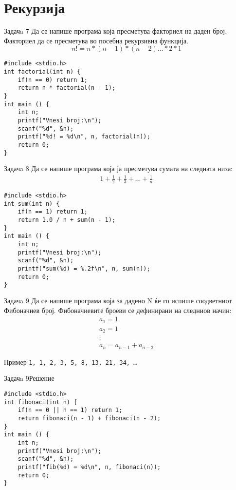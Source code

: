 \section{Рекурзија}
\begin{frame}[fragile]{Задачa 7}
Да се напише програма која пресметува факториел на даден број. Факториел да
се пресметува во посебна рекурзивна функција.
\[
   n! = n * (n - 1) * (n - 2) \ldots * 2 * 1
\]
\pause
\begin{lstlisting}
#include <stdio.h>
int factorial(int n) {
    if(n == 0) return 1;
    return n * factorial(n - 1);
}
int main () {
    int n;
    printf("Vnesi broj:\n");
    scanf("%d", &n);
    printf("%d! = %d\n", n, factorial(n));
    return 0;
}
\end{lstlisting}
\end{frame}

\begin{frame}[fragile]{Задачa 8}
Да се напише програма која ја пресметува сумата на следната низа:
\[
    \begin{array}{l}
    1 + \frac{1}{2} + \frac{1}{3} + \ldots + \frac{1}{n}
    \end{array}
\]
\pause
\begin{lstlisting}
#include <stdio.h>
int sum(int n) {
    if(n == 1) return 1;
    return 1.0 / n + sum(n - 1);
}
int main () {
    int n;
    printf("Vnesi broj:\n");
    scanf("%d", &n);
    printf("sum(%d) = %.2f\n", n, sum(n));
    return 0;
}
\end{lstlisting}
\end{frame}



\begin{frame}{Задачa 9}
Да се напише програма која за дадено N ќе го испише соодветниот Фибоначиев
број. Фибоначиевите броеви се дефинирани на следниов начин:
\[
   \begin{array}{l}
   a_1 = 1\\
   a_2 = 1\\ 
   \vdots\\
   a_n = a_{n - 1} + a_{n - 2}
   \end{array}
\]
\begin{exampleblock}{Пример}
\texttt{1, 1, 2, 3, 5, 8, 13, 21, 34, \ldots} 
\end{exampleblock}
\end{frame}


\begin{frame}[fragile]{Задачa 9}{Решение}
\begin{lstlisting}
#include <stdio.h>
int fibonaci(int n) {
    if(n == 0 || n == 1) return 1;
    return fibonaci(n - 1) + fibonaci(n - 2);
}
int main () {
    int n;
    printf("Vnesi broj:\n");
    scanf("%d", &n);
    printf("fib(%d) = %d\n", n, fibonaci(n));
    return 0;
}
\end{lstlisting}
\end{frame}

